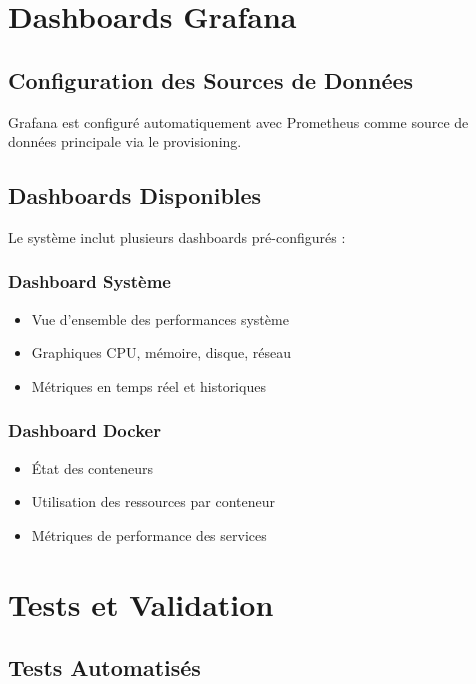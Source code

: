 \documentclass[12pt,a4paper]{report}
\begin{document}
\begin{table}[H]
\begin{itemize}
\chapter{Dashboards Grafana}

\section{Configuration des Sources de Données}

Grafana est configuré automatiquement avec Prometheus comme source de données principale via le provisioning.

\section{Dashboards Disponibles}

Le système inclut plusieurs dashboards pré-configurés :

\subsection{Dashboard Système}

\begin{itemize}
    \item Vue d'ensemble des performances système
    \item Graphiques CPU, mémoire, disque, réseau
    \item Métriques en temps réel et historiques
\end{itemize}

\subsection{Dashboard Docker}

\begin{itemize}
    \item État des conteneurs
    \item Utilisation des ressources par conteneur
    \item Métriques de performance des services
\end{itemize}

\chapter{Tests et Validation}

\section{Tests Automatisés}


\end{itemize}
\end{table}
\end{document}
